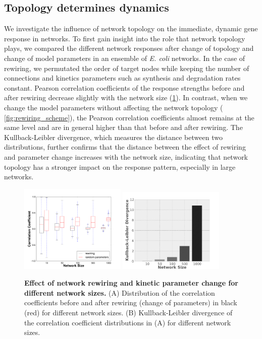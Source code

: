 \subsection{Topology determines dynamics}
We investigate the influence of network topology on the immediate, dynamic gene response in networks. 
To first gain insight into the role that network topology plays, we compared
the different network responses after change of topology and change of model
parameters in an ensemble of \emph{E. coli} networks.
In the case of rewiring, we permutated the order of target nodes while keeping
the number of connections and kinetics parameters such as synthesis and 
degradation rates constant. Pearson correlation coefficients of the response
strengths before and after rewiring decrease slightly with the network size 
(\ref{fig:system_size}). 
In contrast, when we 
change the model parameters without affecting the network topology (%
\ref{fig:rewiring_scheme}), the Pearson correlation coefficients almost remains 
at the same level and 
are in general higher than that before and after rewiring. The Kullback-Leibler
divergence, which measures the distance between two distributions, further 
confirms that the distance between the effect of rewiring and parameter change 
increases with the network size, indicating that network topology has a stronger 
impact on the response pattern, especially in large networks. 

\begin{figure}[!ht]
\begin{center}
\includegraphics[width=0.45\textwidth]{system_size.pdf}
\includegraphics[width=0.45\textwidth]{kl_system_size.pdf}
\end{center}
\caption[Effect of rewiring and parameter change]{
{\bf Effect of network rewiring and kinetic parameter change for different network
sizes.} 
(A) Distribution of the correlation coefficients
before and after rewiring (change of parameters) in black (red) for 
different network sizes. (B) Kullback-Leibler divergence of the 
correlation coefficient distributions in (A) for different network
sizes.
}
\label{fig:system_size}
\end{figure}

